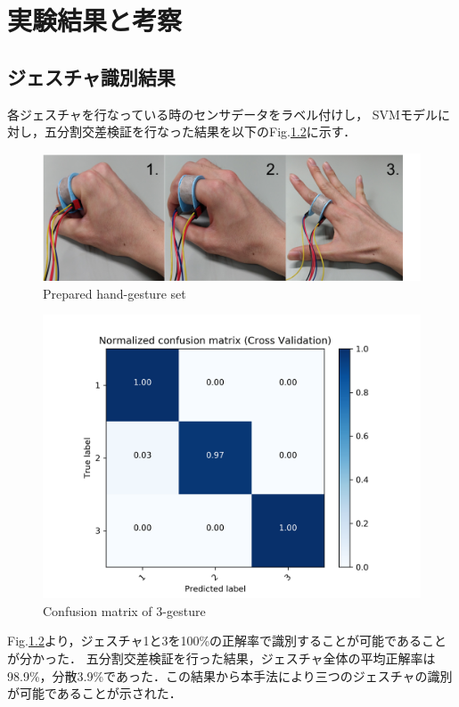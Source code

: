 \chapter{実験結果と考察}

\section{ジェスチャ識別結果}
各ジェスチャを行なっている時のセンサデータをラベル付けし，
SVMモデルに対し，五分割交差検証を行なった結果を以下のFig.\ref{fig:matrix}に示す．


\begin{figure}[H]
  \centering
  \includegraphics[width=0.8\linewidth]{fig/gesture}
  \caption{Prepared hand-gesture set}
  \label{fig:gestures}
\end{figure}

\begin{figure}[H]
  \centering
  \includegraphics[width=0.8\linewidth]{fig/confusion_matrix}
  \caption{Confusion matrix of 3-gesture}
  \label{fig:matrix}
\end{figure}


Fig.\ref{fig:matrix}より，ジェスチャ1と3を100\%の正解率で識別することが可能であることが分かった．
五分割交差検証を行った結果，ジェスチャ全体の平均正解率は98.9\%，分散3.9\%であった．この結果から本手法により三つのジェスチャの識別が可能であることが示された．

